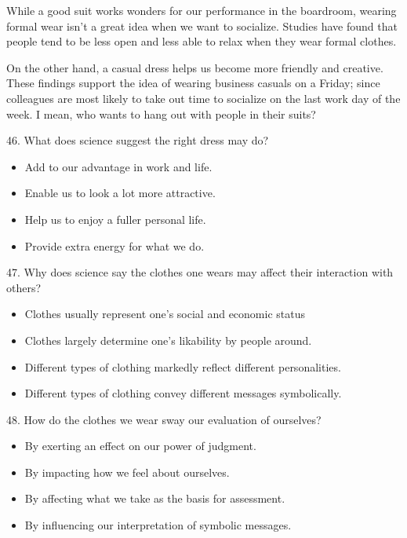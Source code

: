 \documentclass[UTF8,11pt]{ctexart}
\begin{document}
While a good suit works wonders for our performance in the boardroom, wearing formal wear isn’t a great idea when we want to socialize. Studies have found that people tend to be less open and less able to relax when they wear formal clothes.


On the other hand, a casual dress helps us become more friendly and creative. These findings support the idea of wearing business casuals on a Friday; since colleagues are most likely to take out time to socialize on the last work day of the week. I mean, who wants to hang out with people in their suits?


46. What does science suggest the right dress may do?


\begin{itemize}[leftmargin=2em,itemsep=.2em,topsep=.4em]\item[A.] Add to our advantage in work and life.
\item[B.] Enable us to look a lot more attractive.
\item[C.] Help us to enjoy a fuller personal life.
\item[D.] Provide extra energy for what we do.
\end{itemize}

47. Why does science say the clothes one wears may affect their interaction with others?


\begin{itemize}[leftmargin=2em,itemsep=.2em,topsep=.4em]\item[A.] Clothes usually represent one’s social and economic status
\item[B.] Clothes largely determine one’s likability by people around.
\item[C.] Different types of clothing markedly reflect different personalities.
\item[D.] Different types of clothing convey different messages symbolically.
\end{itemize}

48. How do the clothes we wear sway our evaluation of ourselves?


\begin{itemize}[leftmargin=2em,itemsep=.2em,topsep=.4em]\item[A.] By exerting an effect on our power of judgment.
\item[B.] By impacting how we feel about ourselves.
\item[C.] By affecting what we take as the basis for assessment.
\item[D.] By influencing our interpretation of symbolic messages.
\end{itemize}
\end{document}
